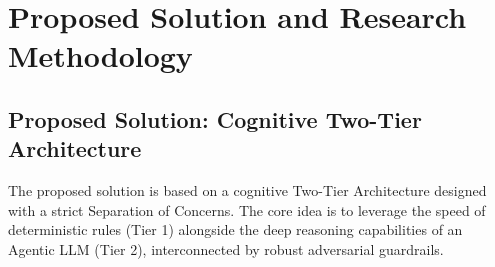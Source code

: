 \documentclass[12pt,a4paper]{article}
\begin{document}
\newpage
\section{Proposed Solution and Research Methodology}

\subsection{Proposed Solution: Cognitive Two-Tier Architecture}
The proposed solution is based on a cognitive Two-Tier Architecture designed with a strict Separation of Concerns. The core idea is to leverage the speed of deterministic rules (Tier 1) alongside the deep reasoning capabilities of an Agentic LLM (Tier 2), interconnected by robust adversarial guardrails.
\end{document}
